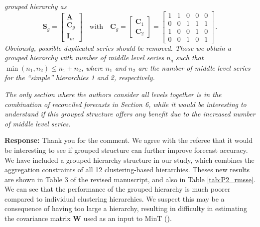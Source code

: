 \documentclass{article}
\numberwithin{equation}{section}
\theoremstyle{plain}
\theoremstyle{definition}
\theoremstyle{remark}
\begin{document}
\textit{grouped hierarchy as}
\[
\boldsymbol{S}_g=\left[\begin{matrix}\boldsymbol{A} \\ \boldsymbol{C}_g \\ \boldsymbol{I}_m \end{matrix}\right] \quad\text{with}\quad \boldsymbol{C}_g =\left[\begin{matrix}
    \boldsymbol{C}_1 \\ \boldsymbol{C}_2
\end{matrix}\right] = \left[ \begin{matrix} 1 & 1 & 0 & 0 & 0 \\ 0 & 0 & 1 & 1 & 1 \\ 1 & 0 & 0 & 1 & 0 \\ 0 & 0 & 1 & 0 & 1 \end{matrix}\right].
\]
\textit{Obviously, possible duplicated series should be removed. Those we obtain a grouped hierarchy with number of middle level series $n_g$ such that $\min(n_1,n_2)\leq n_1+n_2$, where $n_1$ and $n_2$ are the number of middle level series for the ``simple'' hierarchies 1 and 2, respectively.}
\medskip

\textit{The only section where the authors consider all levels together is in the combination of reconciled forecasts in Section 6, while it would be interesting to understand if this grouped structure offers any benefit due to the increased number of middle level series.}

\medskip

\noindent \textbf{Response:} 
Thank you for the comment. We agree with the referee that it would be interesting to see if grouped structure can further improve forecast accuracy. We  have included a grouped hierarchy structure in our study, which combines the aggregation constraints of all 12 clustering-based hierarchies. Theses new results are shown in Table 3 of the revised manuscript, and also in Table \ref{tab:P2_rmsse}. We can see that the performance of the grouped hierarchy is much poorer compared to individual clustering hierarchies. We suspect this may be a consequence of having too large a hierarchy, resulting in difficulty in estimating the covariance matrix $\boldsymbol{W}$ used as an input to MinT (\citealp{pritulargaStochasticCoherencyForecast2021}). 
\end{document}
